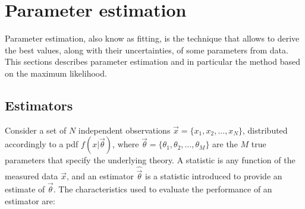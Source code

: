 \section{Parameter estimation}
\label{sec:stat:pe}

Parameter estimation, also know as fitting, is the technique that allows to derive the best values, along with their uncertainties, 
of some parameters from data.
This sections describes parameter estimation and in particular the method based on the maximum likelihood.

\subsection{Estimators}

Consider a set of $N$ independent observations $\vec{x}=\{x_1, x_2, ..., x_{N}\}$, distributed accordingly to a \gls{pdf} $f(x|\vec{\theta})$, where $\vec{\theta}=\{\theta_1, \theta_2, ..., \theta_{M}\}$ are the $M$ true parameters that specify the underlying theory. 
A statistic is any function of the measured data $\vec{x}$, and an estimator $\hat{\vec{\theta}}$ is a statistic introduced to provide an estimate of $\vec{\theta}$.
The characteristics used to evaluate the performance of an estimator are:

